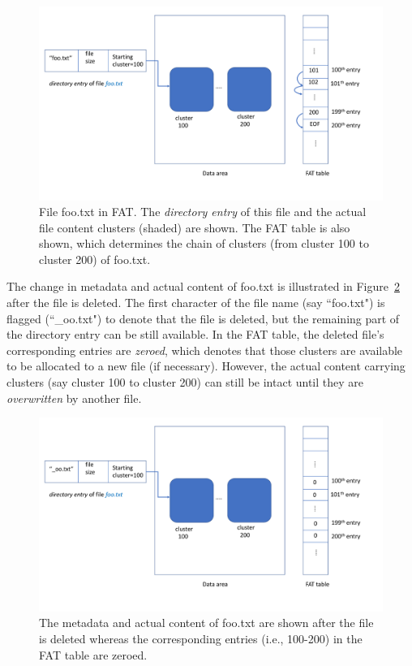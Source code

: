\begin{figure}[h]
    \centering
    \includegraphics[width=\linewidth]{fig/fat1.pdf}
    \caption{File foo.txt in FAT. The \emph{directory entry} of this file and the actual file content clusters (shaded) are shown. 
The FAT table is also shown, which determines the chain of clusters (from cluster 100 to cluster 200) of foo.txt.}
    \label{fig:fat1}
\end{figure}


The change in metadata and actual content of foo.txt is illustrated in Figure~\ref{fig:fat2} after the file is deleted.
The first character of the file name (say ``foo.txt") is flagged (``\_oo.txt") to denote that the file is deleted, 
but the remaining part of the directory entry can be still available. In the FAT table, the deleted file's corresponding
entries are \emph{zeroed}, which denotes that those clusters are available to be allocated to a new file (if necessary).
However, the actual content carrying clusters (say cluster 100 to cluster 200)
can still be intact until they are \emph{overwritten} by another file. 
  
\begin{figure}[h]
    \centering
    \includegraphics[width=\linewidth]{fig/fat2.pdf}
    \caption{The metadata and actual content of foo.txt are shown after the file is deleted whereas the corresponding entries (i.e., 100-200) in the FAT table are zeroed.}
    \label{fig:fat2}
\end{figure}

